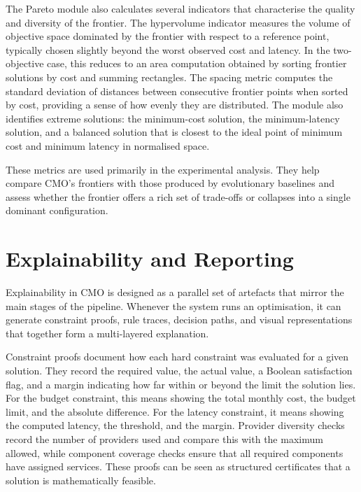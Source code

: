 \documentclass[journal]{IEEEtran}
\newcommand{\cmo}{CMO\xspace}
\begin{document}
The Pareto module also calculates several indicators that characterise the
quality and diversity of the frontier. The hypervolume indicator measures the
volume of objective space dominated by the frontier with respect to a reference
point, typically chosen slightly beyond the worst observed cost and latency. In
the two-objective case, this reduces to an area computation obtained by sorting
frontier solutions by cost and summing rectangles. The spacing metric computes
the standard deviation of distances between consecutive frontier points when
sorted by cost, providing a sense of how evenly they are distributed. The
module also identifies extreme solutions: the minimum-cost solution, the
minimum-latency solution, and a balanced solution that is closest to the ideal
point of minimum cost and minimum latency in normalised space.

These metrics are used primarily in the experimental analysis. They help compare
\cmo's frontiers with those produced by evolutionary baselines and assess
whether the frontier offers a rich set of trade-offs or collapses into a single
dominant configuration.

\section{Explainability and Reporting}
\label{sec:explain}

Explainability in \cmo is designed as a parallel set of artefacts that mirror
the main stages of the pipeline. Whenever the system runs an optimisation, it
can generate constraint proofs, rule traces, decision paths, and visual
representations that together form a multi-layered explanation.

Constraint proofs document how each hard constraint was evaluated for a given
solution. They record the required value, the actual value, a Boolean
satisfaction flag, and a margin indicating how far within or beyond the limit
the solution lies. For the budget constraint, this means showing the total
monthly cost, the budget limit, and the absolute difference. For the latency
constraint, it means showing the computed latency, the threshold, and the
margin. Provider diversity checks record the number of providers used and
compare this with the maximum allowed, while component coverage checks ensure
that all required components have assigned services. These proofs can be seen as
structured certificates that a solution is mathematically feasible.
\end{document}
